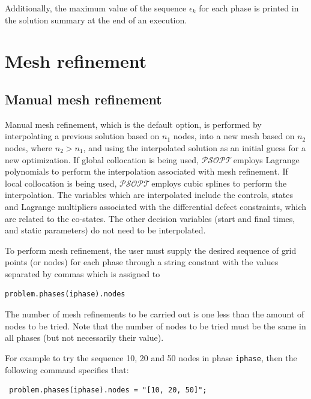 \documentclass[a4paper,11pt]{report}    %
\newcommand{\psopt}{$\mathcal{PSOPT}$\,}  %
\newenvironment{shadedframe}{%
  \def\FrameCommand{\fcolorbox{black}{shadecolor}}%
  \MakeFramed {\FrameRestore}}
{\endMakeFramed}
\begin{document}
Additionally, the maximum value of the sequence $\epsilon_k$ for each phase is printed in 
the solution summary at the end of an execution.

\section{Mesh refinement}

\subsection{Manual mesh refinement}

Manual mesh refinement, which is the default option, is performed by interpolating a previous solution based on $n_1$ nodes,
into a new mesh based on $n_2$ nodes, where $n_2>n_1$, and using the interpolated
solution as an initial guess for a new optimization. If global collocation is being used, \psopt employs Lagrange polynomials
to perform the interpolation associated with mesh refinement. If local collocation is being used, \psopt employs cubic splines
to perform the interpolation.  The variables which are interpolated
include the controls, states and Lagrange multipliers associated with the differential defect constraints,
which are related to the co-states. The other decision variables (start and final times,
and static parameters) do not need to be interpolated.

To perform mesh refinement, the user must supply the desired sequence of grid points (or nodes)
for each phase through a string constant with the values separated by commas which is assigned to

\begin{verbatim}problem.phases(iphase).nodes \end{verbatim}

The number of mesh refinements to be carried out is one less than the amount 
of nodes to be tried. Note that the number of nodes to be
tried must be the same in all phases (but not necessarily their value).

\begin{shadedframe}
For example
to try the sequence 10, 20 and 50 nodes in phase \texttt{iphase}, 
then the following command specifies that:

\begin{verbatim}
 problem.phases(iphase).nodes = "[10, 20, 50]";
\end{verbatim}

 
\end{shadedframe}
\end{document}
